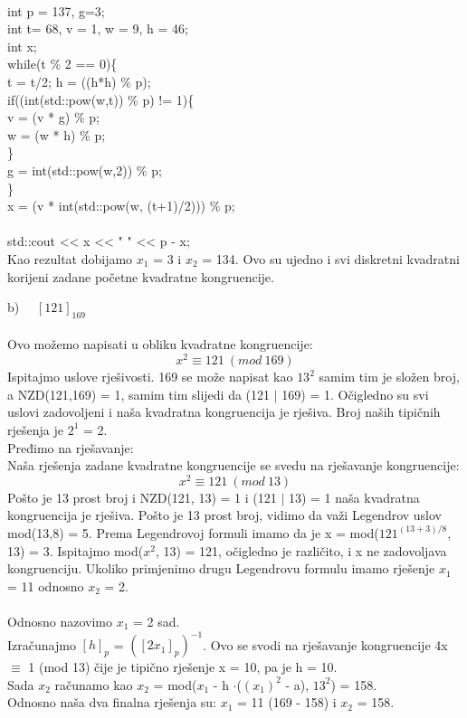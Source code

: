 \documentclass[12pt]{article}
\begin{document}
\begin{enumerate}
\\
    int p = 137, g=3; \\
    int t= 68, v = 1, w = 9, h = 46; \\
    int x; \\
    while(t \% 2 == 0)\{ \\
        t = t/2; h = ((h*h) \% p); \\
        if((int(std::pow(w,t)) \% p) != 1)\{ \\
            v = (v * g) \% p; \\
            w = (w * h) \% p; \\
        \} \\
        g = int(std::pow(w,2)) \% p; \\
    \} \\
     x = (v * int(std::pow(w, (t+1)/2))) \% p; \\
    \\
    std::cout << x << " " << p - x; \\ 
Kao rezultat dobijamo $x_1$ = 3 i $x_2 $ = 134. Ovo su ujedno i svi diskretni kvadratni korijeni zadane početne kvadratne kongruencije. 
\newpage

b) ~~$[121]_{169}$ \\ \\ 
		Ovo možemo napisati u obliku kvadratne kongruencije: 
		\begin{equation*}
		x^2 \equiv 121~(mod~169)
		\end{equation*}
		Ispitajmo uslove rješivosti. 169 se može napisat kao $13^2$ samim tim je složen broj, a
		NZD(121,169) = 1, samim tim slijedi da (121 ${\mid}$ 169) = 1.
		Očigledno su svi uslovi zadovoljeni i naša kvadratna kongruencija je rješiva.
		Broj naših tipičnih rješenja je $2^1$ = 2.
		\\
		Pređimo na rješavanje: \\
		Naša rješenja zadane kvadratne kongruencije se svedu na rješavanje kongruencije:
		\begin{equation*}
		x^2 \equiv 121~(mod~13)
		\end{equation*}
		Pošto je 13 prost broj i NZD(121, 13) = 1 i (121 ${\mid}$ 13) = 1 naša kvadratna kongruencija
		je rješiva. Pošto je 13 prost broj, vidimo da važi Legendrov uslov mod(13,8) = 5.
		Prema Legendrovoj formuli imamo da je x = mod($121^{(13+3)/8}$, 13) = 3.
		Ispitajmo mod($x^2$, 13) = 121, očigledno je različito, i x ne zadovoljava kongruenciju.
		Ukoliko primjenimo drugu Legendrovu formulu imamo rješenje $x_1$ = 11 odnosno $x_2$ = 2. \\ 
		\\
		Odnosno nazovimo $x_1$ = 2 sad. \\
		Izračunajmo $[h]_p$ = $([2x_1]_p)^{-1}$. Ovo se svodi na rješavanje kongruencije 4x ${\equiv}$ 1 (mod 13)
        čije je tipično rješenje x = 10, pa je h = 10. \\ 
        Sada $x_2$ računamo kao $x_2$ = mod($x_1$ - h ${\cdot}$($(x_1)^2$ - a), $13^2$) = 158. \\ 
		Odnosno naša dva finalna rješenja su: $x_1$ = 11 (169 - 158) i $x_2$ = 158. \\
		

\end{enumerate}
\end{document}

